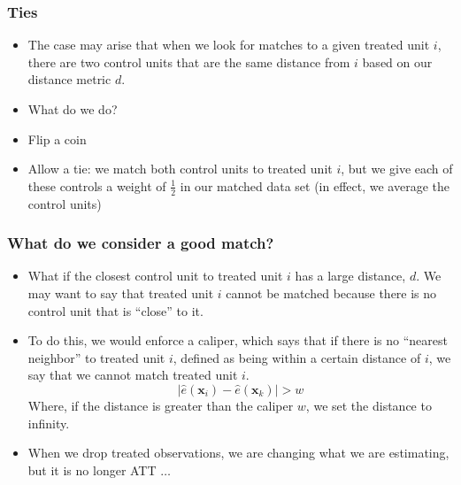 \documentclass{beamer}
\begin{document}
\begin{frame}[c]\frametitle{Ties}
	\begin{itemize}
		\item<+-> The case may arise that when we look for matches to a given treated unit $i$, there are two control units that are the same distance from $i$ based on our distance metric $d$. 
		\item<+-> What do we do?
		\item<+-> Flip a coin
		\item<+-> Allow a tie: we match both control units to treated unit $i$, but we give each of these controls a weight of $\frac{1}{2}$ in our matched data set (in effect, we average the control units)
	\end{itemize}
\end{frame}

\begin{frame}[c]\frametitle{What do we consider a good match?}
	\begin{itemize}
		\item<+-> What if the closest control unit to treated unit $i$ has a large distance, $d$.  We may want to say that treated unit $i$ cannot be matched because there is no control unit that is ``close'' to it. 
		\item<+->  To do this, we would enforce a caliper, which says that if there is no ``nearest neighbor'' to treated unit $i$, defined as being within a certain distance of $i$, we say that we cannot match treated unit $i$.
		\[ | \hat{e}(\mathbf{x}_i) - \hat{e}(\mathbf{x}_k) | > w \]
		 Where, if the distance is greater than the caliper $w$, we set the distance to infinity. 
		 \item<+-> When we drop treated observations, we are changing what we are estimating, but it is no longer ATT $\dots$
	\end{itemize}
\end{frame}
\end{document}

